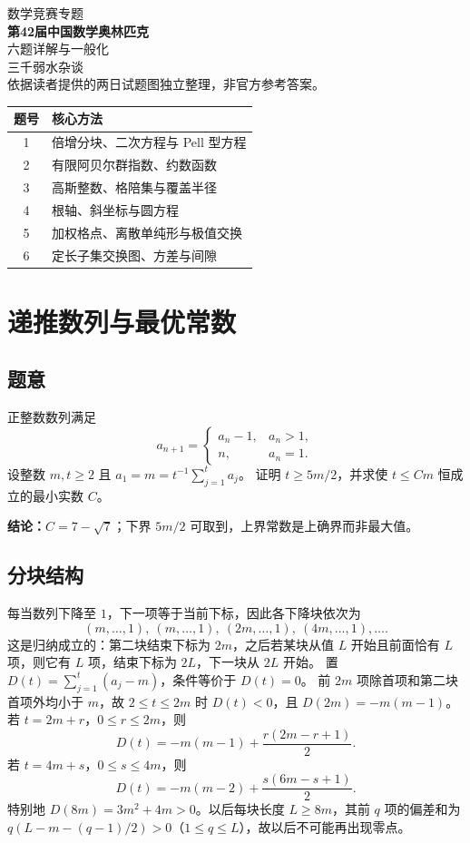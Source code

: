 \documentclass[UTF8,11pt,a4paper,fontset=fandol]{ctexart}
\newcommand{\ans}[1]{\par\noindent\textcolor{accent}{\textbf{结论：}}#1\par}
\begin{document}
\begin{center}
{\small\color{accent} 数学竞赛专题 }\\[8pt]
{\LARGE\bfseries\color{ink} 第42届中国数学奥林匹克}\\[5pt]
{\Large 六题详解与一般化}\\[10pt]
{\large 三千弱水杂谈}\\[6pt]
{\small 依据读者提供的两日试题图独立整理，非官方参考答案。}
\end{center}
\begin{center}
\begin{tabular}{cl}
\toprule
题号&核心方法\\\midrule
1&倍增分块、二次方程与 Pell 型方程\\
2&有限阿贝尔群指数、约数函数\\
3&高斯整数、格陪集与覆盖半径\\
4&根轴、斜坐标与圆方程\\
5&加权格点、离散单纯形与极值交换\\
6&定长子集交换图、方差与间隙\\\bottomrule
\end{tabular}
\end{center}

\section{递推数列与最优常数}
\subsection*{题意}
正整数数列满足
\[
a_{n+1}=\begin{cases}a_n-1,&a_n>1,\\n,&a_n=1.\end{cases}
\]
设整数 $m,t\ge2$ 且 $a_1=m=t^{-1}\sum_{j=1}^t a_j$。
证明 $t\ge5m/2$，并求使 $t\le Cm$ 恒成立的最小实数 $C$。
\ans{$\displaystyle C=7-\sqrt7$；下界 $5m/2$ 可取到，上界常数是上确界而非最大值。}
\subsection*{分块结构}
每当数列下降至 $1$，下一项等于当前下标，因此各下降块依次为
\[
(m,\ldots,1),\ (m,\ldots,1),\
(2m,\ldots,1),\ (4m,\ldots,1),\ldots .
\]
这是归纳成立的：第二块结束下标为 $2m$，之后若某块从值 $L$ 开始且前面恰有 $L$ 项，则它有 $L$ 项，结束下标为 $2L$，下一块从 $2L$ 开始。
置 $D(t)=\sum_{j=1}^t(a_j-m)$，条件等价于 $D(t)=0$。
前 $2m$ 项除首项和第二块首项外均小于 $m$，故 $2\le t\le2m$ 时 $D(t)<0$，且 $D(2m)=-m(m-1)$。
若 $t=2m+r$，$0\le r\le2m$，则
\[
D(t)=-m(m-1)+\frac{r(2m-r+1)}2. \tag{1}
\]
若 $t=4m+s$，$0\le s\le4m$，则
\[
D(t)=-m(m-2)+\frac{s(6m-s+1)}2. \tag{2}
\]
特别地 $D(8m)=3m^2+4m>0$。以后每块长度 $L\ge8m$，其前 $q$ 项的偏差和为
$q(L-m-(q-1)/2)>0$（$1\le q\le L$），故以后不可能再出现零点。
\end{document}
